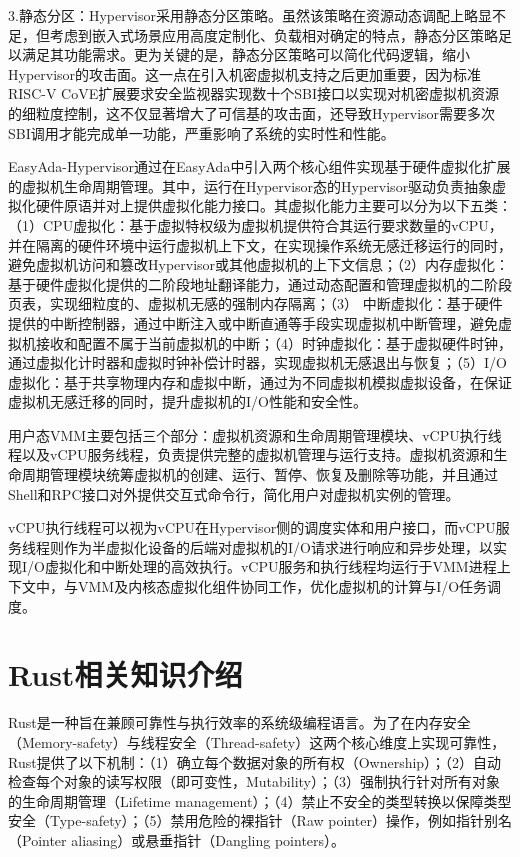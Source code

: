 \documentclass[master, vlined, review]{DissertUESTC}
\begin{document}
	3.静态分区：Hypervisor采用静态分区策略。虽然该策略在资源动态调配上略显不足，但考虑到嵌入式场景应用高度定制化、负载相对确定的特点，静态分区策略足以满足其功能需求。更为关键的是，静态分区策略可以简化代码逻辑，缩小Hypervisor的攻击面。这一点在引入机密虚拟机支持之后更加重要，因为标准RISC-V CoVE扩展要求安全监视器实现数十个SBI接口以实现对机密虚拟机资源的细粒度控制，这不仅显著增大了可信基的攻击面，还导致Hypervisor需要多次SBI调用才能完成单一功能，严重影响了系统的实时性和性能。
	
	EasyAda-Hypervisor通过在EasyAda中引入两个核心组件实现基于硬件虚拟化扩展的虚拟机生命周期管理。其中，运行在Hypervisor态的Hypervisor驱动负责抽象虚拟化硬件原语并对上提供虚拟化能力接口。其虚拟化能力主要可以分为以下五类：（1）CPU虚拟化：基于虚拟特权级为虚拟机提供符合其运行要求数量的vCPU，并在隔离的硬件环境中运行虚拟机上下文，在实现操作系统无感迁移运行的同时，避免虚拟机访问和篡改Hypervisor或其他虚拟机的上下文信息；（2）内存虚拟化：基于硬件虚拟化提供的二阶段地址翻译能力，通过动态配置和管理虚拟机的二阶段页表，实现细粒度的、虚拟机无感的强制内存隔离；（3） 中断虚拟化：基于硬件提供的中断控制器，通过中断注入或中断直通等手段实现虚拟机中断管理，避免虚拟机接收和配置不属于当前虚拟机的中断；（4）时钟虚拟化：基于虚拟硬件时钟，通过虚拟化计时器和虚拟时钟补偿计时器，实现虚拟机无感退出与恢复；（5）I/O虚拟化：基于共享物理内存和虚拟中断，通过为不同虚拟机模拟虚拟设备，在保证虚拟机无感迁移的同时，提升虚拟机的I/O性能和安全性。
		
	用户态VMM主要包括三个部分：虚拟机资源和生命周期管理模块、vCPU执行线程以及vCPU服务线程，负责提供完整的虚拟机管理与运行支持。虚拟机资源和生命周期管理模块统筹虚拟机的创建、运行、暂停、恢复及删除等功能，并且通过Shell和RPC接口对外提供交互式命令行，简化用户对虚拟机实例的管理。
	
	vCPU执行线程可以视为vCPU在Hypervisor侧的调度实体和用户接口，而vCPU服务线程则作为半虚拟化设备的后端对虚拟机的I/O请求进行响应和异步处理，以实现I/O虚拟化和中断处理的高效执行。vCPU服务和执行线程均运行于VMM进程上下文中，与VMM及内核态虚拟化组件协同工作，优化虚拟机的计算与I/O任务调度。
	
	
	\section{Rust相关知识介绍}
	Rust是一种旨在兼顾可靠性与执行效率的系统级编程语言。为了在内存安全（Memory-safety）与线程安全（Thread-safety）这两个核心维度上实现可靠性，Rust提供了以下机制：（1）确立每个数据对象的所有权（Ownership）；（2）自动检查每个对象的读写权限（即可变性，Mutability）；（3）强制执行针对所有对象的生命周期管理（Lifetime management）；（4）禁止不安全的类型转换以保障类型安全（Type-safety）；（5）禁用危险的裸指针（Raw pointer）操作，例如指针别名（Pointer aliasing）或悬垂指针（Dangling pointers）。
	
\end{document}
